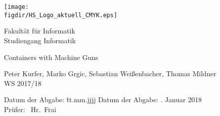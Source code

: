 \begin{titlepage}

\raggedleft

\vspace*{-2cm}

\texttt{[image: \\figdir/HS\_Logo\_aktuell\_CMYK.eps]}

\vfill

\centering
\LARGE
Fakultät für Informatik  \vspace{0.5cm}\\
\Large
Studiengang Informatik

\vspace{2cm}

\LARGE

Containers with Machine Guns
\vspace{2cm}

\Large
Peter Kurfer, Marko Grgic, Sebastian Weißenbacher, Thomas Mildner\\
WS 2017/18

\vspace{1.5cm}

\vspace{1cm}

\flushleft
 \Large
\vspace*{\fill}

\begin{tabbing}
Datum der Abgabe: \= tt.mm.jjjj \kill
Datum der Abgabe: . Januar 2018 \\
Prüfer: \> \ Hr.\ Frai\\
\end{tabbing}

\end{titlepage}

\cleardoubleemptypage


